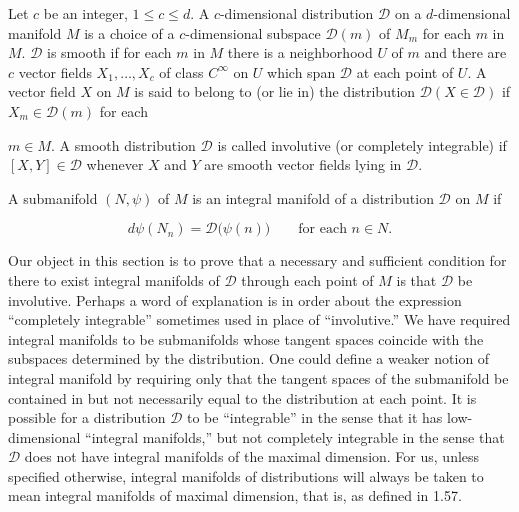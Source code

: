\begin{definition}\label{thm:1.56}
	Let $c$ be an integer, $1 \leq c \leq d$. A $c$-dimensional distribution $\mathcal{D}$ on a $d$-dimensional manifold $M$ is a choice of a $c$-dimensional subspace $\mathcal{D}(m)$ of $M_m$ for each $m$ in $M$. $\mathcal{D}$ is smooth if for each $m$ in $M$ there is a neighborhood $U$ of $m$ and there are $c$ vector fields $X_1, \ldots, X_c$ of class $C^\infty$ on $U$ which span $\mathcal{D}$ at each point of $U$. A vector field $X$ on $M$ is said to belong to (or lie in) the distribution $\mathcal{D}(X \in \mathcal{D})$ if $X_m \in \mathcal{D}(m)$ for each 

	$ m \in M $. A smooth distribution  $ \mathcal{D} $ is called involutive (or completely integrable) if  $ [X, Y] \in \mathcal{D} $ whenever  $ X $ and  $ Y $ are smooth vector fields lying in  $ \mathcal{D} $.

\end{definition}

\begin{definition}\label{thm:1.57}
	A submanifold $(N,\psi)$ of $M$ is an integral manifold of a distribution $\mathcal{D}$ on $M$ if 

	\begin{equation}
		\tag{1}\label{eq:1.57:1}
		d\psi(N_{n})=\mathcal{D}\big(\psi(n)\big)\qquad\text{for each }n\in N.
	\end{equation}

\end{definition}

\begin{remarks}\label{thm:1.58}
	Our object in this section is to prove that a necessary and sufficient condition for there to exist integral manifolds of $\mathcal{D}$ through each point of $M$ is that $\mathcal{D}$ be involutive. Perhaps a word of explanation is in order about the expression “completely integrable” sometimes used in place of “involutive.” We have required integral manifolds to be submanifolds whose tangent spaces coincide with the subspaces determined by the distribution. One could define a weaker notion of integral manifold by requiring only that the tangent spaces of the submanifold be contained in but not necessarily equal to the distribution at each point. It is possible for a distribution $\mathcal{D}$ to be “integrable” in the sense that it has low-dimensional “integral manifolds,” but not completely integrable in the sense that $\mathcal{D}$ does not have integral manifolds of the maximal dimension. For us, unless specified otherwise, integral manifolds of distributions will always be taken to mean integral manifolds of maximal dimension, that is, as defined in 1.57.

\end{remarks}

